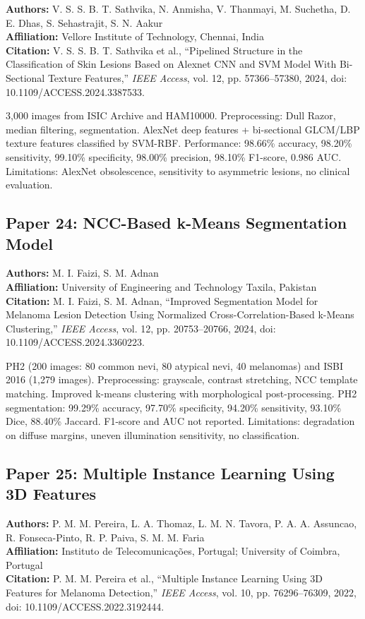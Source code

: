 \documentclass[conference]{IEEEtran}
\begin{document}
\noindent\textbf{Authors:} V. S. S. B. T. Sathvika, N. Anmisha, V. Thanmayi, M. Suchetha, D. E. Dhas, S. Sehastrajit, S. N. Aakur\\
\textbf{Affiliation:} Vellore Institute of Technology, Chennai, India\\
\textbf{Citation:} V. S. S. B. T. Sathvika et al., ``Pipelined Structure in the Classification of Skin Lesions Based on Alexnet CNN and SVM Model With Bi-Sectional Texture Features,'' \textit{IEEE Access}, vol. 12, pp. 57366--57380, 2024, doi: 10.1109/ACCESS.2024.3387533.

3,000 images from ISIC Archive and HAM10000. Preprocessing: Dull Razor, median filtering, segmentation. AlexNet deep features + bi-sectional GLCM/LBP texture features classified by SVM-RBF. Performance: 98.66\% accuracy, 98.20\% sensitivity, 99.10\% specificity, 98.00\% precision, 98.10\% F1-score, 0.986 AUC. Limitations: AlexNet obsolescence, sensitivity to asymmetric lesions, no clinical evaluation.

\subsection{Paper 24: NCC-Based k-Means Segmentation Model}

\noindent\textbf{Authors:} M. I. Faizi, S. M. Adnan\\
\textbf{Affiliation:} University of Engineering and Technology Taxila, Pakistan\\
\textbf{Citation:} M. I. Faizi, S. M. Adnan, ``Improved Segmentation Model for Melanoma Lesion Detection Using Normalized Cross-Correlation-Based k-Means Clustering,'' \textit{IEEE Access}, vol. 12, pp. 20753--20766, 2024, doi: 10.1109/ACCESS.2024.3360223.

PH2 (200 images: 80 common nevi, 80 atypical nevi, 40 melanomas) and ISBI 2016 (1,279 images). Preprocessing: grayscale, contrast stretching, NCC template matching. Improved k-means clustering with morphological post-processing. PH2 segmentation: 99.29\% accuracy, 97.70\% specificity, 94.20\% sensitivity, 93.10\% Dice, 88.40\% Jaccard. F1-score and AUC not reported. Limitations: degradation on diffuse margins, uneven illumination sensitivity, no classification.

\subsection{Paper 25: Multiple Instance Learning Using 3D Features}

\noindent\textbf{Authors:} P. M. M. Pereira, L. A. Thomaz, L. M. N. Tavora, P. A. A. Assuncao, R. Fonseca-Pinto, R. P. Paiva, S. M. M. Faria\\
\textbf{Affiliation:} Instituto de Telecomunicações, Portugal; University of Coimbra, Portugal\\
\textbf{Citation:} P. M. M. Pereira et al., ``Multiple Instance Learning Using 3D Features for Melanoma Detection,'' \textit{IEEE Access}, vol. 10, pp. 76296--76309, 2022, doi: 10.1109/ACCESS.2022.3192444.
\end{document}
